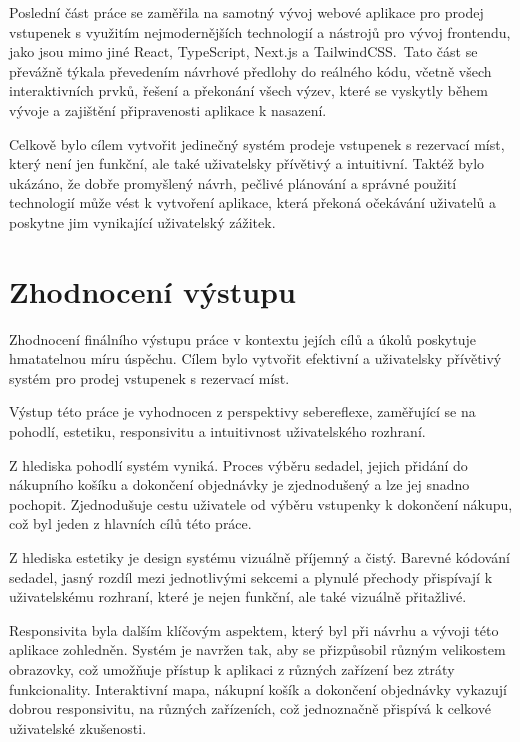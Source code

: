 Poslední část práce se zaměřila na samotný vývoj webové aplikace pro prodej vstupenek s využitím nejmodernějších technologií a nástrojů pro vývoj frontendu, jako jsou mimo jiné React, TypeScript, Next.js a TailwindCSS.\
Tato část se převážně týkala převedením návrhové předlohy do reálného kódu, včetně všech interaktivních prvků, řešení a překonání všech výzev, které se vyskytly během vývoje a zajištění připravenosti aplikace k nasazení.

Celkově bylo cílem vytvořit jedinečný systém prodeje vstupenek s rezervací míst, který není jen funkční, ale také uživatelsky přívětivý a intuitivní.
Taktéž bylo ukázáno, že dobře promyšlený návrh, pečlivé plánování a správné použití technologií může vést k vytvoření aplikace, která překoná očekávání uživatelů a poskytne jim vynikající uživatelský zážitek.

\section*{Zhodnocení výstupu}
\label{sec:zaver-zhodnoceni}
Zhodnocení finálního výstupu práce v kontextu jejích cílů a úkolů poskytuje hmatatelnou míru úspěchu.
Cílem bylo vytvořit efektivní a uživatelsky přívětivý systém pro prodej vstupenek s rezervací míst.

Výstup této práce je vyhodnocen z perspektivy sebereflexe, zaměřující se na pohodlí, estetiku, responsivitu a intuitivnost uživatelského rozhraní.

Z hlediska pohodlí systém vyniká.
Proces výběru sedadel, jejich přidání do nákupního košíku a dokončení objednávky je zjednodušený a lze jej snadno pochopit.
Zjednodušuje cestu uživatele od výběru vstupenky k dokončení nákupu, což byl jeden z hlavních cílů této práce.

Z hlediska estetiky je design systému vizuálně příjemný a čistý.
Barevné kódování sedadel, jasný rozdíl mezi jednotlivými sekcemi a plynulé přechody přispívají k uživatelskému rozhraní, které je nejen funkční, ale také vizuálně přitažlivé.

Responsivita byla dalším klíčovým aspektem, který byl při návrhu a vývoji této aplikace zohledněn.
Systém je navržen tak, aby se přizpůsobil různým velikostem obrazovky, což umožňuje přístup k aplikaci z různých zařízení bez ztráty funkcionality.
Interaktivní mapa, nákupní košík a dokončení objednávky vykazují dobrou responsivitu, na různých zařízeních, což jednoznačně přispívá k celkové uživatelské zkušenosti.

